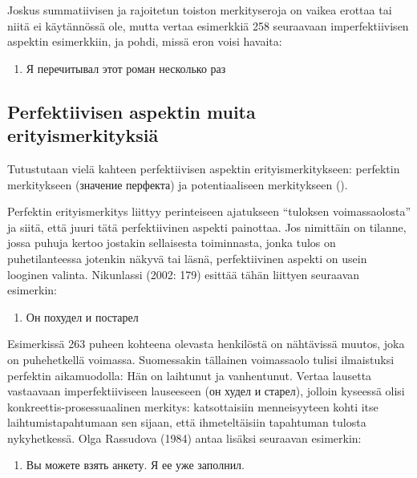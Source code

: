 \documentclass[]{scrreprt}
\providecommand{\tightlist}{%
  \setlength{\itemsep}{0pt}\setlength{\parskip}{0pt}}
\begin{document}
Joskus summatiivisen ja rajoitetun toiston merkityseroja on vaikea
erottaa tai niitä ei käytännössä ole, mutta vertaa esimerkkiä 258
seuraavaan imperfektiivisen aspektin esimerkkiin, ja pohdi, missä eron
voisi havaita:

\begin{enumerate}
\def\labelenumi{(\arabic{enumi})}
\setcounter{enumi}{261}
\tightlist
\item
  Я перечитывал этот роман несколько раз
\end{enumerate}

\subsection{Perfektiivisen aspektin muita
erityismerkityksiä}\label{perfektiivisen-aspektin-muita-erityismerkityksiuxe4}

Tutustutaan vielä kahteen perfektiivisen aspektin erityismerkitykseen:
perfektin merkitykseen (значение перфекта) ja potentiaaliseen
merkitykseen ().

Perfektin erityismerkitys liittyy perinteiseen ajatukseen ``tuloksen
voimassaolosta'' ja siitä, että juuri tätä perfektiivinen aspekti
painottaa. Jos nimittäin on tilanne, jossa puhuja kertoo jostakin
sellaisesta toiminnasta, jonka tulos on puhetilanteessa jotenkin näkyvä
tai läsnä, perfektiivinen aspekti on usein looginen valinta. Nikunlassi
(2002: 179) esittää tähän liittyen seuraavan esimerkin:

\begin{enumerate}
\def\labelenumi{(\arabic{enumi})}
\setcounter{enumi}{262}
\tightlist
\item
  Он похудел и постарел
\end{enumerate}

Esimerkissä 263 puheen kohteena olevasta henkilöstä on nähtävissä
muutos, joka on puhehetkellä voimassa. Suomessakin tällainen voimassaolo
tulisi ilmaistuksi perfektin aikamuodolla: Hän on laihtunut ja
vanhentunut. Vertaa lausetta vastaavaan imperfektiiviseen lauseeseen (он
худел и старел), jolloin kyseessä olisi konkreettis-prosessuaalinen
merkitys: katsottaisiin menneisyyteen kohti itse laihtumistapahtumaan
sen sijaan, että ihmeteltäisiin tapahtuman tulosta nykyhetkessä. Olga
Rassudova (1984) antaa lisäksi seuraavan esimerkin:

\begin{enumerate}
\def\labelenumi{(\arabic{enumi})}
\setcounter{enumi}{263}
\tightlist
\item
  Вы можете взять анкету. Я ее уже заполнил.
\end{enumerate}
\end{document}
